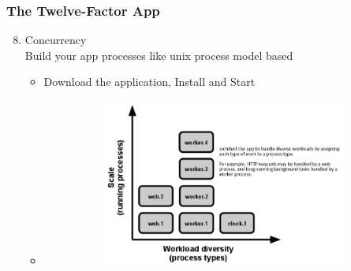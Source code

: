 \documentclass{beamer}
\begin{document}
	\begin{frame}
		\frametitle{The Twelve-Factor App}
		\begin{enumerate}
			\setcounter{enumi}{7}
			\item Concurrency \\
			\hspace{2mm} \scriptsize{Build your app processes like unix process model based}
				
			\begin{itemize}
				\item<1-> \scriptsize {Download the application, Install and Start}
				\item<1->[]
				\begin{figure}[h]
					\includegraphics[width=100mm,height= 55mm, scale=1]{img/process-types.png}
				\end{figure}
			\end{itemize}
		\end{enumerate}
	\end{frame}
\end{document}
